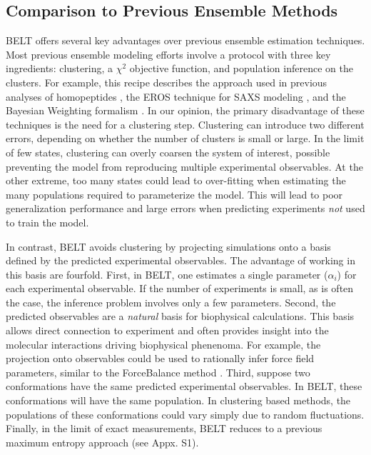 \documentclass[journal=jacsat,manuscript=article]{achemso}
\begin{document}
\subsection{Comparison to Previous Ensemble Methods}

BELT offers several key advantages over previous ensemble estimation techniques.  Most previous ensemble modeling efforts involve a protocol with three key ingredients: clustering, a $\chi^2$ objective function, and population inference on the clusters.  For example, this recipe describes the approach used in previous analyses of homopeptides \cite{Graf2007}, the EROS technique for SAXS modeling \cite{rozycki2011saxs}, and the Bayesian Weighting formalism \cite{fisher2010}.  In our opinion, the primary disadvantage of these techniques is the need for a clustering step.  Clustering can introduce two different errors, depending on whether the number of clusters is small or large.  In the limit of few states, clustering can overly coarsen the system of interest, possible preventing the model from reproducing multiple experimental observables.  At the other extreme, too many states could lead to over-fitting when estimating the many populations required to parameterize the model.  This will lead to poor 
generalization performance and large errors when predicting experiments \emph{not} used to train the model.  

In contrast, BELT avoids clustering by projecting simulations onto a basis defined by the predicted experimental observables.  The advantage of working in this basis are fourfold. First, in BELT, one estimates a single parameter ($\alpha_i$) for each experimental observable.  If the number of experiments is small, as is often the case, the inference problem involves only a few parameters.  Second, the predicted observables are a \emph{natural} basis for biophysical calculations.  This basis allows direct connection to experiment and often provides insight into the molecular interactions driving biophysical phenenoma.  For example, the projection onto observables could be used to rationally infer force field parameters, similar to the ForceBalance method \cite{wang2012, wang2013systematic}.  Third, suppose two conformations have the same predicted experimental observables.  In BELT, these conformations will have the same population.  In clustering based methods, the populations of these conformations could 
vary simply due to random fluctuations.  Finally, in the limit of exact measurements, BELT reduces to a previous \cite{chodera2012} maximum entropy approach (see Appx. S1).  
\end{document}
